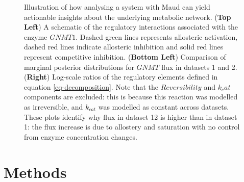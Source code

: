 \documentclass[journal=asbcd6,manuscript=article,layout=traditional]{achemso}
\begin{document}
\begin{figure}

\begin{minipage}[t]{\linewidth}

{\centering 


}

\end{minipage}%

\caption{\label{fig-decomposition}Illustration of how analysing a system
with Maud can yield actionable insights about the underlying metabolic
network. (\textbf{Top Left}) A schematic of the regulatory interactions
associated with the enzyme \(GNMT1\). Dashed green lines represents
allosteric activation, dashed red lines indicate allosteric inhibition
and solid red lines represent competitive inhibition. (\textbf{Bottom
Left}) Comparison of marginal posterior distributions for \(GNMT\) flux
in datasets 1 and 2. (\textbf{Right}) Log-scale ratios of the regulatory
elements defined in equation \eqref{eq-decomposition}. Note that the
\(Reversibility\) and \(k_cat\) components are excluded: this is because
this reaction was modelled as irreversible, and \(k_{cat}\) was modelled
as constant across datasets. These plots identify why flux in dataset 12
is higher than in dataset 1: the flux increase is due to allostery and
saturation with no control from enzyme concentration changes.}

\end{figure}

\hypertarget{methods}{%
\section{Methods}\label{methods}}
\end{document}
